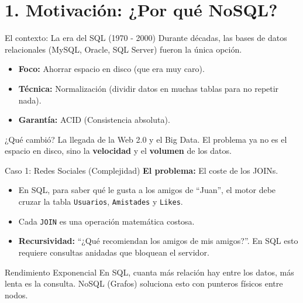 \section{1. Motivación: ¿Por qué NoSQL?}

\begin{frame}{El contexto: La era del SQL (1970 - 2000)}
    Durante décadas, las bases de datos relacionales (MySQL, Oracle, SQL Server) fueron la única opción.
    \begin{itemize}
        \item \textbf{Foco:} Ahorrar espacio en disco (que era muy caro).
        \item \textbf{Técnica:} Normalización (dividir datos en muchas tablas para no repetir nada).
        \item \textbf{Garantía:} ACID (Consistencia absoluta).
    \end{itemize}
    \begin{exampleblock}{¿Qué cambió?}
        La llegada de la Web 2.0 y el Big Data. El problema ya no es el espacio en disco, sino la \textbf{velocidad} y el \textbf{volumen} de los datos.
    \end{exampleblock}
\end{frame}

\begin{frame}{Caso 1: Redes Sociales (Complejidad)}
  \textbf{El problema:} El coste de los JOINs.
  \begin{itemize}
    \item En SQL, para saber qué le gusta a los amigos de ``Juan'', el motor debe cruzar la tabla \texttt{Usuarios}, \texttt{Amistades} y \texttt{Likes}.
    \item Cada \texttt{JOIN} es una operación matemática costosa.
    \item \textbf{Recursividad:} ``¿Qué recomiendan los amigos de mis amigos?''. En SQL esto requiere consultas anidadas que bloquean el servidor.
  \end{itemize}
  \begin{alertblock}{Rendimiento Exponencial}
    En SQL, cuanta más relación hay entre los datos, más lenta es la consulta. NoSQL (Grafos) soluciona esto con punteros físicos entre nodos.
  \end{alertblock}
\end{frame}


